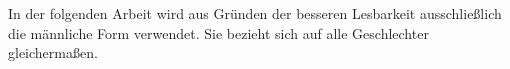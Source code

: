 In der folgenden Arbeit wird aus Gründen der besseren Lesbarkeit ausschließlich die männliche Form verwendet. Sie bezieht sich auf alle Geschlechter gleichermaßen.